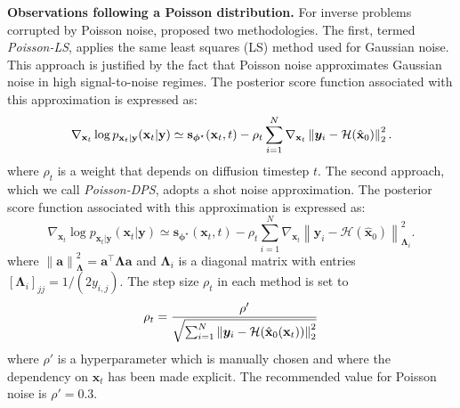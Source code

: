 \textbf{Observations following a Poisson distribution.} For inverse problems corrupted by Poisson noise, \citet{chung2023} proposed two methodologies. The first, termed \textit{Poisson-LS}, applies the same least squares (LS) method used for Gaussian noise. This approach is justified by the fact that Poisson noise approximates Gaussian noise in high signal-to-noise regimes. The posterior score function associated with this approximation is expressed as:
\begin{equation*}
\nabla_{\mathbf{x}_t}\log p_{\mathbf{x}_t \vert  \mathbf{y}}(\mathbf{x}_t \vert  \mathbf{y}) \simeq \mathbf{s}_{\boldsymbol{\phi}^{\star}}(\mathbf{x}_t, t) - \rho_t \sum_{i = 1}^N  \nabla_{\mathbf{x}_t} \left\lVert  \boldsymbol{y}_i - \mathcal{H}(\hat{\mathbf{x}}_{0})  \right\rVert_2^2.
\end{equation*}
where $\rho_t$ is a weight that depends on diffusion timestep $t$.
The second approach, which we call \textit{Poisson-DPS}, adopts a shot noise approximation. The posterior score function associated with this approximation is expressed as:
\begin{equation} \label{eq:poisson_dps}
\nabla_{\mathbf{x}_t}\log p_{\mathbf{x}_t \vert  \mathbf{y}}(\mathbf{x}_t \vert  \mathbf{y}) \simeq \mathbf{s}_{\boldsymbol{\phi}^{\star}}(\mathbf{x}_t, t) - \rho_t \sum_{i = 1}^N  \nabla_{\mathbf{x}_t} 
\left\lVert \boldsymbol{y}_i - \mathcal{H}(\hat{\mathbf{x}}_{0}) \right\rVert_{\boldsymbol{\Lambda}_i}^2.
\end{equation}
where $\left\lVert \mathbf{a} \right\rVert_{\boldsymbol{\Lambda}}^2 = \mathbf{a}^\top \boldsymbol{\Lambda} \mathbf{a}$ and $\boldsymbol{\Lambda}_i$ is a diagonal matrix with entries $[\boldsymbol{\Lambda}_i]_{jj} = 1/(2 y_{i,j})$.
The step size $\rho_t$ in each method is set to 
\begin{equation*}
    \rho_t = \frac{\rho'}{\sqrt{\sum_{i = 1}^N \left\lVert \boldsymbol{y}_i - \mathcal{H}(\hat{\mathbf{x}}_{0}(\mathbf{x}_t)) \right\rVert_2^2}}
\end{equation*}
where $\rho'$ is a hyperparameter which is manually chosen and where the dependency on $\mathbf{x}_{t}$ has been made explicit. The recommended value for Poisson noise is $\rho' = 0.3$. 

